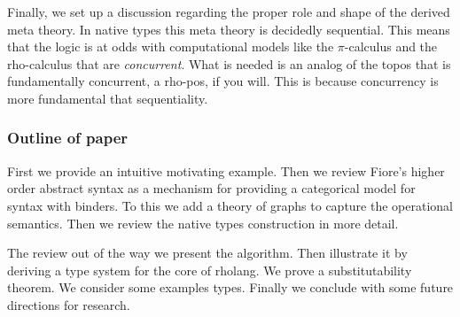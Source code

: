 Finally, we set up a discussion regarding the proper role and shape of
the derived meta theory. In native types this meta theory is decidedly
sequential. This means that the logic is at odds with computational
models like the $\pi$-calculus and the rho-calculus that are
\emph{concurrent}. What is needed is an analog of the topos that is
fundamentally concurrent, a rho-pos, if you will. This is because
concurrency is more fundamental that sequentiality.

\subsubsection{Outline of paper}
First we provide an intuitive motivating example. Then we review Fiore's higher order abstract syntax as a mechanism for providing a categorical model for syntax with binders. To this we add a theory of graphs to capture the operational semantics. Then we review the native types construction in more detail.

The review out of the way we present the algorithm. Then illustrate it
by deriving a type system for the core of rholang. We prove a
substitutability theorem. We consider some examples types. Finally we
conclude with some future directions for research.

